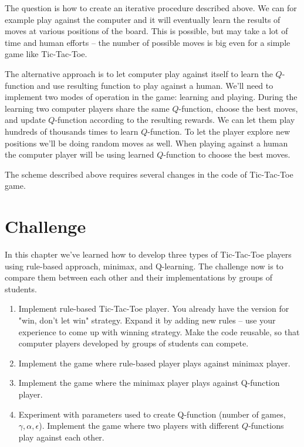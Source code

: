 The question is how to create an iterative procedure described above.
We can for example play against the computer and it will eventually
learn the results of moves at various positions of the board. This
is possible, but may take a lot of time and human efforts -- the number of
possible moves is big even for a simple game like Tic-Tac-Toe.

The alternative approach is to let computer play against itself
to learn the $Q$-function and use resulting function to play against
a human. We'll need to implement two modes of operation in the game:
learning and playing. During the learning two computer players
share the same $Q$-function, choose the best moves, and update
$Q$-function according to the resulting rewards. We can let them
play hundreds of thousands times to learn $Q$-function. To let
the player explore new positions we'll be doing random moves as well.
When playing against a human the computer player will be using
learned $Q$-function to choose the best moves.

The scheme described above requires several changes in the code
of Tic-Tac-Toe game.


















\section{Challenge}

In this chapter we've learned how to develop three types of
Tic-Tac-Toe players using rule-based approach, minimax, and Q-learning.
The challenge now is to compare them between each other and their
implementations by groups of students.

\begin{enumerate}
\item Implement rule-based Tic-Tac-Toe player. You already have the version
for "win, don't let win" strategy. Expand it by adding new rules -- use
your experience to come up with winning strategy.
Make the code reusable, so that computer players developed by
groups of students can compete.
\item Implement the game where rule-based player plays against
 minimax player.
\item Implement the game where the minimax player plays against 
Q-function player.
\item Experiment with parameters used to create Q-function (number of
games, $\gamma, \alpha, \epsilon$). Implement the game where two players
with different $Q$-functions play against each other.
\end{enumerate}









